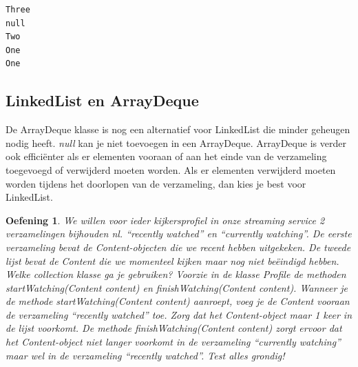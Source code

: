 \documentclass{tstextbook}
\newtheorem{envoefening}{Oefening}[chapter]
\newenvironment{oefening}
               {\begin{boxexercise}\begin{envoefening}}
               {\end{envoefening}\end{boxexercise}}
\begin{document}
\begin{verbatim}
Three
null
Two
One
One
\end{verbatim}

\subsection{LinkedList en ArrayDeque}

De ArrayDeque klasse is nog een alternatief voor LinkedList die minder geheugen nodig heeft.
\textit{null} kan je niet toevoegen in een ArrayDeque. ArrayDeque is verder ook 
effici\"enter als er elementen vooraan of aan het einde van de verzameling toegevoegd of verwijderd moeten worden. Als er elementen verwijderd moeten worden tijdens het doorlopen van de verzameling, dan kies je best voor LinkedList.

\begin{oefening}
We willen voor ieder kijkersprofiel in onze streaming service 2 verzamelingen bijhouden nl. ``recently watched'' en ``currently watching''. De eerste verzameling bevat de Content-objecten die we recent hebben uitgekeken. De tweede lijst bevat de Content die we momenteel kijken maar nog niet be\"eindigd hebben. 
Welke collection klasse ga je gebruiken? Voorzie in de klasse Profile de methoden \textit{startWatching(Content content)} en \textit{finishWatching(Content content)}.
Wanneer je de methode \textit{startWatching(Content content)} aanroept, voeg je de Content vooraan de verzameling ``recently watched'' toe. Zorg dat het Content-object maar 1 keer in de lijst voorkomt. De methode  \textit{finishWatching(Content content)} zorgt ervoor dat het Content-object niet langer voorkomt in de verzameling ``currently watching'' maar wel in de verzameling ``recently watched''. Test alles grondig!
\end{oefening}
\end{document}
